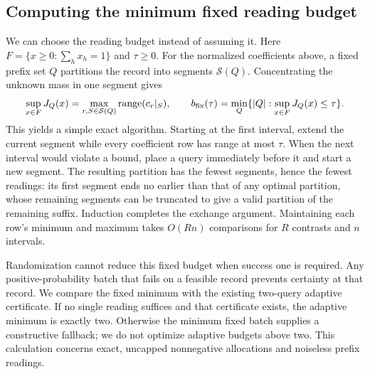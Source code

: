 \subsection{Computing the minimum fixed reading budget}
\label{sec:minimum-fixed-budget}
We can choose the reading budget instead of assuming it. Here
$F=\{x\geq0:\sum_hx_h=1\}$ and $\tau\geq0$. For the normalized
coefficients above, a fixed prefix set $Q$ partitions the record into segments
$\mathcal S(Q)$. Concentrating the unknown mass in one segment gives
\[
 \sup_{x\in F}J_Q(x)=
 \max_{r,S\in\mathcal S(Q)}\operatorname{range}(c_r|_S),\qquad
 b_{\rm fix}(\tau)=\min_Q\{|Q|:\sup_{x\in F}J_Q(x)\leq\tau\}.
\]
This yields a simple exact algorithm. Starting at the first interval, extend
the current segment while every coefficient row has range at most $\tau$.
When the next interval would violate a bound, place a query immediately
before it and start a new segment. The resulting partition has the fewest
segments, hence the fewest readings: its first segment ends no earlier than
that of any optimal partition, whose remaining segments can be truncated
to give a valid partition of the remaining suffix. Induction completes the
exchange argument. Maintaining each row's minimum and maximum takes
$O(Rn)$ comparisons for $R$ contrasts and $n$ intervals.

Randomization cannot reduce this fixed budget when success one is required.
Any positive-probability batch that fails on a feasible record prevents
certainty at that record. We compare the fixed minimum with the existing
two-query adaptive certificate. If no single reading suffices and that
certificate exists, the adaptive minimum is exactly two. Otherwise the
minimum fixed batch supplies a constructive fallback; we do not optimize
adaptive budgets above two. This calculation concerns exact, uncapped
nonnegative allocations and noiseless prefix readings.
